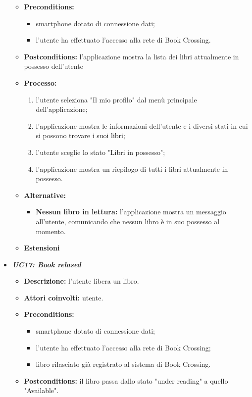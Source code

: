\begin{itemize}
\begin{itemize}
		\item \textbf{Preconditions:}
		\begin{itemize}
			\item smartphone dotato di connessione dati;
			\item l’utente ha effettuato l’accesso alla rete di Book Crossing.
		\end{itemize}
		\item \textbf{Postconditions:} l'applicazione mostra la lista dei libri attualmente in possesso dell'utente 
		\item \textbf{Processo:}
		\begin{enumerate}
			\item l'utente seleziona "Il mio profilo" dal menù principale dell'applicazione;
			\item l'applicazione mostra le informazioni dell'utente e i diversi stati in cui si possono trovare i suoi libri;
			\item l'utente sceglie lo stato "Libri in possesso";
			\item l'applicazione mostra un riepilogo di tutti i libri attualmente in possesso.
		\end{enumerate}
		\item \textbf{Alternative:}
		\begin{itemize}
			\item \textbf{Nessun libro in lettura:} l'applicazione mostra un messaggio all'utente, comunicando che nessun libro è in suo possesso al momento.
		\end{itemize}
		\item \textbf{Estensioni}
	\end{itemize}
	\item \textbf{\textit{UC17: Book relased}}
	\begin{itemize}
		\item \textbf{Descrizione:} l'utente libera un libro.
		\item \textbf{Attori coinvolti:} utente.
		\item \textbf{Preconditions:}
		\begin{itemize}
			\item smartphone dotato di connessione dati;
			\item l’utente ha effettuato l’accesso alla rete di Book Crossing;
			\item libro rilasciato già registrato al sistema di Book Crossing.
		\end{itemize}
		\item \textbf{Postconditions:} il libro passa dallo stato "under reading" a quello "Available".

\end{itemize}
\end{itemize}
